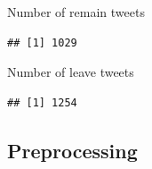 \documentclass[10pt  ,usenames, dvipsnames]{article}\usepackage[]{graphicx}\usepackage[]{color}
\makeatletter
\newenvironment{kframe}{%
 \def\at@end@of@kframe{}%
 \ifinner\ifhmode%
  \def\at@end@of@kframe{\end{minipage}}%
  \begin{minipage}{\columnwidth}%
 \fi\fi%
 \def\FrameCommand##1{\hskip\@totalleftmargin \hskip-\fboxsep
 \colorbox{shadecolor}{##1}\hskip-\fboxsep
     \hskip-\linewidth \hskip-\@totalleftmargin \hskip\columnwidth}%
 \MakeFramed {\advance\hsize-\width
   \@totalleftmargin\z@ \linewidth\hsize
   \@setminipage}}%
 {\par\unskip\endMakeFramed%
 \at@end@of@kframe}
\newenvironment{knitrout}{}{} %
\makeatother
\begin{document}
Number of remain tweets
\begin{knitrout}
\color{fgcolor}\begin{kframe}
\begin{verbatim}
## [1] 1029
\end{verbatim}
\end{kframe}
\end{knitrout}

Number of leave tweets
\begin{knitrout}
\color{fgcolor}\begin{kframe}
\begin{verbatim}
## [1] 1254
\end{verbatim}
\end{kframe}
\end{knitrout}


\subsection{Preprocessing}
\end{document}
